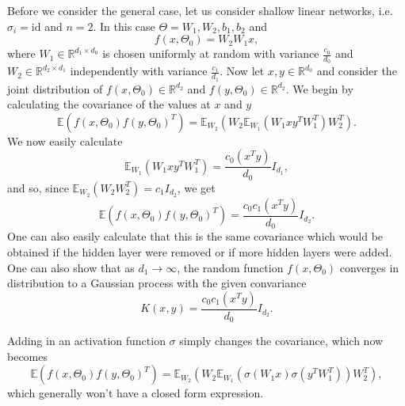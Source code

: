 Before we consider the general case, let us consider shallow linear networks, i.e. $\sigma_i = \text{id}$ and $n=2$. In this case $\Theta = W_1, W_2, b_1, b_2$ and 
\begin{equation}
 f(x,\Theta_0) = W_2W_1x,
\end{equation}
where $W_1\in \mathbb{R}^{d_1\times d_0}$ is chosen uniformly at random with variance $\frac{c_0}{d_0}$ and $W_2\in \mathbb{R}^{d_2\times d_1}$ independently with variance $\frac{c_1}{d_1}$. Now let $x,y\in \mathbb{R}^{d_0}$ and consider the joint distribution of $f(x,\Theta_0)\in \mathbb{R}^{d_2}$ and $f(y,\Theta_0)\in \mathbb{R}^{d_2}$. We begin by calculating the covariance of the values at $x$ and $y$
\begin{equation}
 \mathbb{E}(f(x,\Theta_0)f(y,\Theta_0)^T) = \mathbb{E}_{W_2}(W_2\mathbb{E}_{W_1}(W_1xy^TW_1^T)W_2^T).
\end{equation}
We now easily calculate
\begin{equation}
 \mathbb{E}_{W_1}(W_1xy^TW_1^T) = \frac{c_0(x^Ty)}{d_0}I_{d_1},
\end{equation}
and so, since $\mathbb{E}_{W_2}(W_2W_2^T) = c_1I_{d_2}$, we get
\begin{equation}
 \mathbb{E}(f(x,\Theta_0)f(y,\Theta_0)^T) = \frac{c_0c_1(x^Ty)}{d_0}I_{d_2}.
\end{equation}
One can also easily calculate that this is the same covariance which would be obtained if the hidden layer were removed or if more hidden layers were added. One can also show that as $d_1\rightarrow \infty$, the random function $f(x,\Theta_0)$ converges in distribution to a Gaussian process with the given convariance
\begin{equation}
 K(x,y) = \frac{c_0c_1(x^Ty)}{d_0}I_{d_2}.
\end{equation}

Adding in an activation function $\sigma$ simply changes the covariance, which now becomes
\begin{equation}
 \mathbb{E}(f(x,\Theta_0)f(y,\Theta_0)^T) = \mathbb{E}_{W_2}(W_2\mathbb{E}_{W_1}(\sigma(W_1x)\sigma(y^TW_1^T))W_2^T),
\end{equation}
which generally won't have a closed form expression.

